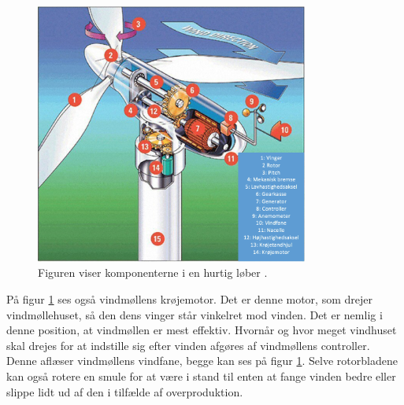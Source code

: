 \begin{figure}[H]
\centering
\includegraphics[width=0.80\textwidth]{billeder/vindmollen}
\caption{Figuren viser komponenterne i en hurtig løber \citep{windturbine}.}
\label{fig:vindmollen}
\end{figure}

På figur \ref{fig:vindmollen} ses også vindmøllens krøjemotor. Det er denne motor, som drejer vindmøllehuset, så den dens vinger står vinkelret mod vinden. Det er nemlig i denne position, at vindmøllen er mest effektiv. Hvornår og hvor meget vindhuset skal drejes for at indstille sig efter vinden afgøres af vindmøllens controller. Denne aflæser vindmøllens vindfane, begge kan ses på figur \ref{fig:vindmollen}. Selve rotorbladene kan også rotere en smule for at være i stand til enten at fange vinden bedre eller slippe lidt ud af den i tilfælde af overproduktion. 

